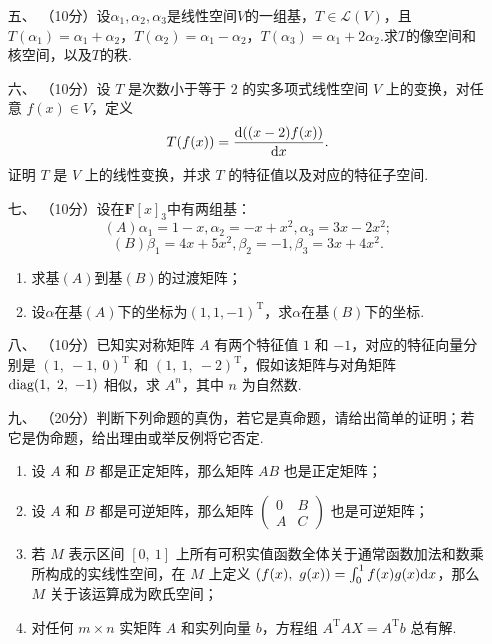 \begin{enumerate}
	\item[五、]（10分）设$\alpha_1,\alpha_2,\alpha_3$是线性空间$V$的一组基，$T\in\mathcal{L}(V)$，且$T(\alpha_1)=\alpha_1+\alpha_2$，$T(\alpha_2)=\alpha_1-\alpha_2$，$T(\alpha_3)=\alpha_1+2\alpha_2$.求$T$的像空间和核空间，以及$T$的秩.
	\item[六、]（10分）设 $T$ 是次数小于等于 $2$ 的实多项式线性空间 $V$ 上的变换，对任意 $f(x) \in V$，定义
    \[T(f(x))=\frac{\textup{d}((x-2)f(x))}{\textup{d}x}.\]
    证明 $T$ 是 $V$ 上的线性变换，并求 $T$ 的特征值以及对应的特征子空间.
	\item[七、]（10分）设在$\mathbf{F}[x]_3$中有两组基：
	\[(A)\alpha_1=1-x,\alpha_2=-x+x^2,\alpha_3=3x-2x^2;\]
    \[(B)\beta_1=4x+5x^2,\beta_2=-1,\beta_3=3x+4x^2.\]
    \begin{enumerate}[label=(\arabic*)]
        \item 求基$(A)$到基$(B)$的过渡矩阵；
        \item 设$\alpha$在基$(A)$下的坐标为$(1,1,-1)^{\mathrm{T}}$，求$\alpha$在基$(B)$下的坐标.
    \end{enumerate}
    \item[八、]（10分）已知实对称矩阵 $A$ 有两个特征值 $1$ 和 $-1$，对应的特征向量分别是 $(1,\ -1,\ 0)^\mathrm{T}$ 和 $(1,\ 1,\ -2)^\mathrm{T}$，假如该矩阵与对角矩阵 $\textup{diag}(1,\ 2,\ -1)$ 相似，求 $A^n$，其中 $n$ 为自然数.
	\item[九、]（20分）判断下列命题的真伪，若它是真命题，请给出简单的证明；若它是伪命题，给出理由或举反例将它否定.
    \begin{enumerate}[label=(\arabic*)]
        \item 设 $A$ 和 $B$ 都是正定矩阵，那么矩阵 $AB$ 也是正定矩阵；
        \item 设 $A$ 和 $B$ 都是可逆矩阵，那么矩阵 $\begin{pmatrix}0 & B \\ A & C\end{pmatrix}$ 也是可逆矩阵；
        \item 若 $M$ 表示区间 $[0,\ 1]$ 上所有可积实值函数全体关于通常函数加法和数乘所构成的实线性空间，在 $M$ 上定义 $(f(x),\ g(x))=\int_0^1f(x)g(x)\textup{d}x$，那么 $M$ 关于该运算成为欧氏空间；
        \item 对任何 $m \times n$ 实矩阵 $A$ 和实列向量 $b$，方程组 $A^\mathrm{T}AX=A^\mathrm{T}b$ 总有解.
    \end{enumerate}
\end{enumerate}

\clearpage
